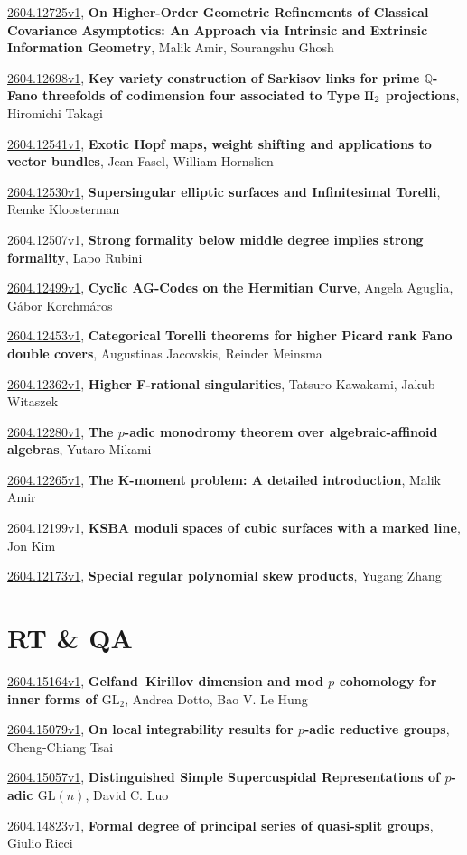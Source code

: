 \documentclass[9pt, a4paper]{article}
\theoremstyle{plain}
\theoremstyle{definition}
\theoremstyle{remark}
\newcommand{\arxiv}[3]{\href{https://arxiv.org/abs/#1}{#1}, \textbf{\textcolor{arxivblue}{#2}}, #3}
\begin{document}
\arxiv{2604.12725v1}{On Higher-Order Geometric Refinements of Classical Covariance Asymptotics: An Approach via Intrinsic and Extrinsic Information Geometry}{Malik Amir, Sourangshu Ghosh}

\arxiv{2604.12698v1}{Key variety construction of Sarkisov links for prime $\mathbb{Q}$-Fano threefolds of codimension four associated to Type ${\rm II}_{2}$ projections}{Hiromichi Takagi}

\arxiv{2604.12541v1}{Exotic Hopf maps, weight shifting and applications to vector bundles}{Jean Fasel, William Hornslien}

\arxiv{2604.12530v1}{Supersingular elliptic surfaces and Infinitesimal Torelli}{Remke Kloosterman}

\arxiv{2604.12507v1}{Strong formality below middle degree implies strong formality}{Lapo Rubini}

\arxiv{2604.12499v1}{Cyclic AG-Codes on the Hermitian Curve}{Angela Aguglia, Gábor Korchmáros}

\arxiv{2604.12453v1}{Categorical Torelli theorems for higher Picard rank Fano double covers}{Augustinas Jacovskis, Reinder Meinsma}

\arxiv{2604.12362v1}{Higher F-rational singularities}{Tatsuro Kawakami, Jakub Witaszek}

\arxiv{2604.12280v1}{The $p$-adic monodromy theorem over algebraic-affinoid algebras}{Yutaro Mikami}

\arxiv{2604.12265v1}{The K-moment problem: A detailed introduction}{Malik Amir}

\arxiv{2604.12199v1}{KSBA moduli spaces of cubic surfaces with a marked line}{Jon Kim}

\arxiv{2604.12173v1}{Special regular polynomial skew products}{Yugang Zhang}


\section{RT \& QA}
\arxiv{2604.15164v1}{Gelfand--Kirillov dimension and mod $p$ cohomology for inner forms of $\mathrm{GL}_2$}{Andrea Dotto, Bao V. Le Hung}

\arxiv{2604.15079v1}{On local integrability results for $p$-adic reductive groups}{Cheng-Chiang Tsai}

\arxiv{2604.15057v1}{Distinguished Simple Supercuspidal Representations of $p$-adic $\text{GL}(n)$}{David C. Luo}

\arxiv{2604.14823v1}{Formal degree of principal series of quasi-split groups}{Giulio Ricci}
\end{document}
